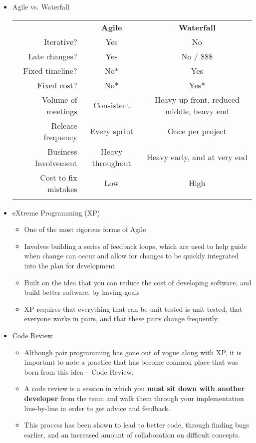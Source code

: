 \begin{itemize}
	\item Agile vs. Waterfall\\
		\begin{tabular}{r | c c |}
			\multicolumn{1}{c}{\phantom{text}}& \multicolumn{1}{c}{\textbf{Agile}} & \multicolumn{1}{c}{\textbf{Waterfall}}\\\hhline{~|--|}
			Iterative? & \cellcolor{green!25}Yes & \cellcolor{green!15}No\\
			Late changes? & \cellcolor{green!25}Yes & \cellcolor{green!15}No / \$\$\$\\
			Fixed timeline? & \cellcolor{green!15}No* & \cellcolor{green!25}Yes\\
			Fixed cost? & \cellcolor{green!15}No* & \cellcolor{green!25}Yes*\\
			Volume of meetings & \cellcolor{green!25}Consistent & Heavy up front, reduced middle, heavy end\\
			Release frequency & \cellcolor{green!25}Every sprint & \cellcolor{green!15}Once per project\\
			Business Involvement & Heavy throughout & Heavy early, and at very end\\
			Cost to fix mistakes & \cellcolor{green!25}Low & \cellcolor{green!15}High\\
			\hhline{~|--|}
		\end{tabular}

	\item eXtreme Programming (XP)
	\begin{itemize}
		\item One of the most rigorous forms of Agile
		\item Involves building a series of feedback loops, which are used to help guide when change can occur and allow for changes to be quickly integrated into the plan for development
		\item Built on the idea that you can reduce the cost of developing software, and build better software, by having goals
		\item XP requires that everything that can be unit tested is unit tested, that everyone works in pairs, and that these pairs change frequently
	\end{itemize}

	\item Code Review
	\begin{itemize}
		\item Although pair programming has gone out of vogue along with XP, it is important to note a practice that has become common place that was born from this idea -- Code Review.
		\item A code review is a session in which you \textbf{must sit down with another developer} from the team and walk them through your implementation line-by-line in order to get advice and feedback.
		\item This process has been shown to lead to better code, through finding bugs earlier, and an increased amount of collaboration on difficult concepts.
	\end{itemize}


\end{itemize}
